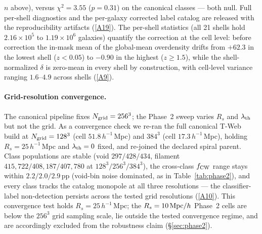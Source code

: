 \documentclass[aps,prd,twocolumn,superscriptaddress,showpacs,preprintnumbers,nofootinbib,longbibliography,floatfix]{revtex4-2}
\newcommand{\repoBase}{https://github.com/Hubify-Projects/bigbounce/blob/main}
\begin{document}
$n$ above), versus $\chi^2 = 3.55$ ($p = 0.31$) on
the canonical classes — both null. Full per-shell diagnostics and
the per-galaxy
corrected label catalog are released with the reproducibility
artifacts
(\href{\repoBase/pipelines/p5\_desi\_chirality/outputs/16\_cosmic\_web\_zshell\_corrected.json}{[A19]}).
The per-shell statistics (all 21 shells hold $2.16\times10^{5}$ to
$1.19\times10^{6}$ galaxies) quantify the correction at the cell
level: before correction the in-mask mean of the global-mean
overdensity drifts from $+62.3$ in the lowest shell ($z<0.05$) to
$-0.90$ in the highest ($z \geq 1.5$), while the shell-normalized
$\delta$ is zero-mean in every shell by construction, with cell-level
variance ranging $1.6$--$4.9$ across shells
(\href{\repoBase/pipelines/p5\_desi\_chirality/outputs/22\_r24conf\_local\_batch.json}{[A9]}).

\paragraph{Grid-resolution convergence.} The canonical pipeline fixes
$N_{\rm grid} = 256^3$; the Phase~2 sweep varies $R_s$ and
$\lambda_{\rm th}$ but not the grid. As a convergence check we re-ran
the full canonical T-Web build at $N_{\rm grid} = 128^3$ (cell
$51.8\,h^{-1}$\,Mpc) and $384^3$ (cell $17.3\,h^{-1}$\,Mpc), holding
$R_s = 25\,h^{-1}$\,Mpc and $\lambda_{\rm th} = 0$ fixed, and re-joined
the declared spiral parent. Class populations are stable (void
$297/428/434$, filament $415{,}722/408{,}187/407{,}780$ at
$128^3/256^3/384^3$), the cross-class $f_{\rm CW}$ range stays within
$2.2/2.0/2.9$\,pp (void-bin noise dominated, as in
Table~\ref{tab:phase2}), and every class tracks the catalog monopole
at all three resolutions — the classifier-label non-detection persists
across the tested grid resolutions
(\href{\repoBase/pipelines/p5\_desi\_chirality/outputs/17\_v0151\_closure\_recomputes.json}{[A10]}).
This convergence test holds $R_s = 25\,h^{-1}$\,Mpc; the
$R_s = 10\,{\rm Mpc}/h$ Phase~2 cells are below the $256^3$ grid
sampling scale, lie outside the tested convergence regime, and are
accordingly excluded from the robustness claim
(\S\ref{sec:phase2}).
\end{document}

